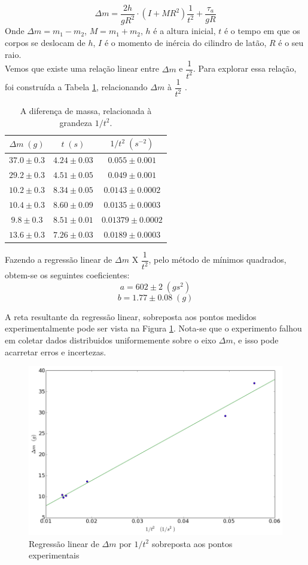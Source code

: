 \documentclass[12pt,a4paper]{article}
\begin{document}
$$\Delta m = \frac{2h}{gR^2} \cdot (I + MR^2)\dfrac{1}{t^2}  + \frac{\tau _a} {gR}$$
Onde $\Delta m = m_1 - m_2$, $ M = m_1 + m_2 $, $h$ é a altura inicial, $t$ é o tempo em que os corpos se deslocam de $h$, $I$ é o momento de inércia do cilindro de latão, $R$ é o seu raio.\\
Vemos que existe uma relação linear entre $\Delta m$ e $ \dfrac{1}{t^2}$. Para explorar essa relação, foi construída a Tabela \ref{linear}, relacionando $\Delta m$ à $ \dfrac{1}{t^2} $ .

\begin{table}[!htbp]
\centering
\def\arraystretch{1.5}
\caption{A diferença de massa, relacionada à grandeza $1/t^2$.}
\begin{tabular}{|c|c|c|}
\hline 
$\Delta m \; (g)$ & $t \; (s)$ & $1/t^2 \; (s^{-2})$ \\ 
\hline 
$37.0 \pm 0.3$ & $4.24 \pm 0.03 $ & $0.055 \pm 0.001 $  \\
\hline
$29.2 \pm 0.3$ & $4.51 \pm 0.05 $ & $0.049 \pm 0.001$ \\
\hline
$10.2 \pm 0.3$ & $8.34 \pm 0.05 $ & $0.0143 \pm 0.0002$\\
\hline
$10.4 \pm 0.3$ & $8.60 \pm 0.09 $ & $ 0.0135 \pm 0.0003 $\\
\hline
$9.8 \pm 0.3$ & $8.51 \pm 0.01 $ & $ 0.01379 \pm 0.0002 $\\
\hline
$13.6 \pm 0.3$ & $7.26 \pm 0.03 $ & $ 0.0189 \pm 0.0003 $ \\
\hline
\end{tabular} 
\label{linear}
\end{table}
Fazendo a regressão linear de $ \Delta m$ X $ \dfrac{1}{t^2} $, pelo método de mínimos quadrados, obtem-se os seguintes coeficientes: 
	$$ a = 602 \pm 2 \; (gs^2)$$
	$$ b = 1.77 \pm 0.08 \; (g) $$

A reta resultante da regressão linear, sobreposta aos pontos medidos experimentalmente pode ser vista na Figura \ref{grafico}. Nota-se que o experimento falhou em coletar dados distribuidos uniformemente sobre o eixo $ \Delta m$, e isso pode acarretar erros e incertezas.

\begin{figure}
\includegraphics[scale=0.55]{grafico.png}
\caption{Regressão linear de $\Delta m$ por $1/t^2$ sobreposta aos pontos experimentais}
\label{grafico}
\end{figure}
\end{document}
